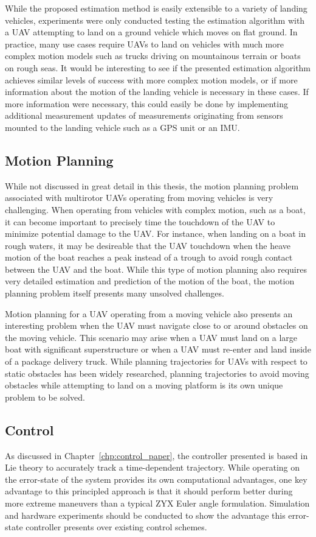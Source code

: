 While the proposed estimation method is easily extensible to a variety of
landing vehicles, experiments were only conducted testing the estimation
algorithm with a UAV attempting to land on a ground vehicle which moves on flat
ground. In practice, many use cases require UAVs to land on
vehicles with much more complex motion models such as trucks driving on
mountainous terrain or boats on rough seas.
It would be interesting to see if the presented estimation algorithm achieves
similar levels of success with more complex motion models, or if more
information about the motion of the landing vehicle is necessary in these cases.
If more information were necessary, this could easily be done by implementing
additional measurement updates of
measurements originating from sensors mounted to the landing vehicle such as a
GPS unit or an IMU.

\subsection{Motion Planning}
\label{sec:future_motion_planning}
While not discussed in great detail in this thesis, the motion planning problem
associated with multirotor UAVs operating from moving vehicles is very
challenging. When operating from vehicles with complex motion, such as a boat,
it can become important to precisely time the touchdown of the UAV to minimize
potential damage to the UAV. For instance, when landing on a boat in rough
waters, it may be desireable that the UAV touchdown when the heave motion of the
boat reaches a peak instead of a trough to avoid rough contact between the UAV
and the boat. While this type of motion planning also requires very detailed
estimation and prediction of the motion of the boat, the motion
planning problem itself presents many unsolved challenges.

Motion planning for a UAV operating from a moving vehicle also presents an
interesting problem when the UAV must navigate close to or around obstacles on
the moving vehicle. This scenario may arise when a UAV must land on a large boat
with significant superstructure or when a UAV must re-enter and land inside of a
package delivery truck. While planning trajectories for UAVs with respect to
static obstacles has been widely researched, planning trajectories to avoid
moving obstacles while attempting to land on a moving platform is its own unique
problem to be solved.

\subsection{Control}
As discussed in Chapter~\ref{chp:control_paper}, the controller presented is
based in Lie theory to accurately track a time-dependent trajectory. While
operating on the error-state of the system provides its own computational
advantages, one key advantage to this principled approach is that it should
perform better during more extreme maneuvers than a typical ZYX Euler angle
formulation. Simulation and hardware experiments should be conducted to show the
advantage this error-state controller presents over existing control schemes.


